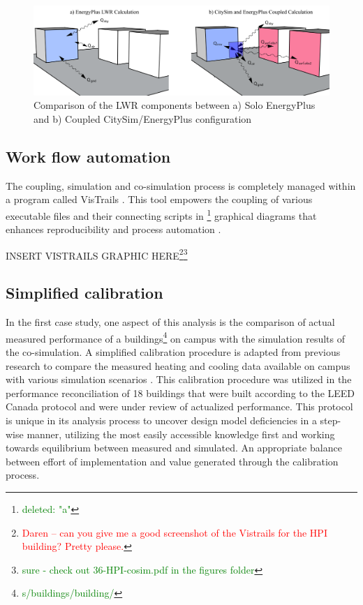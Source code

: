 \documentclass{tBPS2e}
\theoremstyle{plain}
\theoremstyle{definition}
\theoremstyle{remark}
\newcommand{\noteCM}[1]{\footnote{\textcolor{red}{#1}}}
\newcommand{\noteDT}[1]{\footnote{\textcolor{green}{#1}}}
\begin{document}
\begin{figure}[H]
  \centering
  \includegraphics[width=1.0\textwidth]{figures/LWRCalc_Combined_V3}
  \caption{Comparison of the LWR components between a) Solo EnergyPlus and b) Coupled CitySim/EnergyPlus configuration \citep{Miller:2015vk}
  \label{combinedLWR}}
\end{figure}

\subsection{Work flow automation}
The coupling, simulation and co-simulation process is completely managed within a program called VisTrails \citep{Anonymous:Cayf2tu7}. This tool empowers the coupling of various executable files and their connecting scripts in \noteDT{deleted: "a"} graphical diagrams that enhances reproducibility and process automation \citep{Freire:2014tt}.

INSERT VISTRAILS GRAPHIC HERE\noteCM{Daren -- can you give me a good screenshot of the Vistrails for the HPI building? Pretty please.}\noteDT{sure - check out 36-HPI-cosim.pdf in the figures folder}


\subsection{Simplified calibration}
In the first case study, one aspect of this analysis is the comparison of actual measured performance of a buildings\noteDT{s/buildings/building/} on campus with the simulation results of the co-simulation. A simplified calibration procedure is adapted from previous research to compare the measured heating and cooling data available on campus with various simulation scenarios \citep{Samuelson:2015jg}. This calibration procedure was utilized in the performance reconciliation of 18 buildings that were built according to the LEED Canada protocol and were under review of actualized performance. This protocol is unique in its analysis process to uncover design model deficiencies in a step-wise manner, utilizing the most easily accessible knowledge first and working towards equilibrium between measured and simulated. An appropriate balance between effort of implementation and value generated through the calibration process. 
\end{document}
